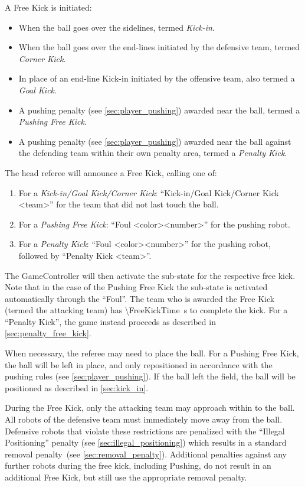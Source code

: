 A Free Kick is initiated:
\begin{itemize}
  \item When the ball goes over the sidelines, termed \emph{Kick-in}.
  \item When the ball goes over the end-lines initiated by the defensive team, termed \emph{Corner Kick}.
  \item In place of an end-line Kick-in initiated by the offensive team, also termed a \emph{Goal Kick}.
  \item A pushing penalty (see \cref{sec:player_pushing}) awarded near the ball, termed a \emph{Pushing Free Kick}.
  \item A pushing penalty (see \cref{sec:player_pushing}) awarded near the ball against the defending team within their own penalty area, termed a \textit{Penalty Kick}.
\end{itemize}

The head referee will announce a Free Kick, calling one of:
\begin{enumerate}
  \item For a \textit{Kick-in/Goal Kick/Corner Kick}: ``Kick-in/Goal Kick/Corner Kick \textless team\textgreater'' for the team that did not last touch the ball.
  \item For a \textit{Pushing Free Kick}: ``Foul \textless color\textgreater \textless number\textgreater'' for the pushing robot.
  \item For a \textit{Penalty Kick}: ``Foul \textless color\textgreater \textless number\textgreater'' for the pushing robot, followed by ``Penalty Kick \textless team\textgreater''.
\end{enumerate}

The GameController will then activate the sub-state for the respective free kick. Note that in the case of the Pushing Free Kick the sub-state is activated automatically through the ``Foul''.
The team who is awarded the Free Kick (termed the attacking team) has \qty{\FreeKickTime}{\second} to complete the kick.
For a ``Penalty Kick'', the game instead proceeds as described in \cref{sec:penalty_free_kick}.

When necessary, the referee may need to place the ball.
For a Pushing Free Kick, the ball will be left in place, and only repositioned in accordance with the pushing rules (see \cref{sec:player_pushing}).
If the ball left the field, the ball will be positioned as described in \cref{sec:kick_in}.

During the Free Kick, only the attacking team may approach within \FreeKickRadius to the ball. All robots of the defensive team must immediately move away from the ball. Defensive robots that violate these restrictions are penalized with the ``Illegal Positioning'' penalty (see \cref{sec:illegal_positioning}) which results in a standard removal penalty~(see \cref{sec:removal_penalty}).
Additional penalties against any further robots during the free kick, including Pushing, do not result in an additional Free Kick, but still use the appropriate removal penalty.

